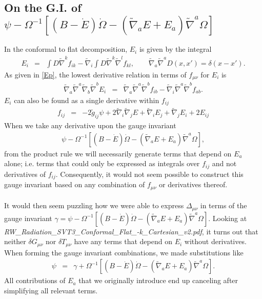 \documentclass[10pt,letterpaper]{article}
\numberwithin{equation}{section}
\begin{document}
\subsection{On the G.I. of $\psi- \Omega^{-1}[(B-\dot E)\dot\Omega- (\tilde\nabla_a E + E_a)\tilde\nabla^a\Omega]$ }
In the conformal to flat decomposition, $E_i$ is given by the integral
\begin{eqnarray}
E_i &=& \int D \tilde\nabla^k f_{ik} - \tilde\nabla_i \int D \tilde\nabla^k \tilde\nabla^l f_{kl},\qquad \tilde\nabla_a\tilde\nabla^a D(x,x') = \delta(x-x').
\end{eqnarray}
As given in \eqref{Ep}, the lowest derivative relation in terms of $f_{\mu\nu}$ for $E_i$ is
\begin{eqnarray}
\tilde\nabla_a\tilde\nabla^a \tilde\nabla_b\tilde\nabla^b E_i &=&
\tilde\nabla_a\tilde\nabla^a \tilde\nabla^b f_{ib} - \tilde\nabla_i \tilde\nabla^a\tilde\nabla^b f_{ab}.
\end{eqnarray}
$E_i$ can also be found as a single derivative within $f_{ij}$
\begin{eqnarray}
f_{ij}&=& -2\tilde g_{ij}\psi + 2\tilde\nabla_i\tilde\nabla_j E + \tilde\nabla_i E_j + \tilde\nabla_j E_i + 2E_{ij}
\end{eqnarray}
When we take any derivative upon the gauge invariant
\begin{eqnarray}
\psi- \Omega^{-1}[(B-\dot E)\dot\Omega- (\tilde\nabla_a E + E_a)\tilde\nabla^a\Omega],
\end{eqnarray}
from the product rule we will necessarily generate terms that depend on $E_a$ alone; i.e. terms that could only be expressed as integrals over $f_{ij}$ and not derivatives of $f_{ij}$. Consequently, it would not seem possible to construct this gauge invariant based on any combination of $f_{\mu\nu}$ or derivatives thereof. 
\\ \\
It would then seem puzzling how we were able to express $\Delta_{\mu\nu}$ in terms of the gauge invariant $\gamma=\psi- \Omega^{-1}[(B-\dot E)\dot\Omega- (\tilde\nabla_a E + E_a)\tilde\nabla^a\Omega]$. Looking at \emph{RW\_Radiation\_SVT3\_Conformal\_Flat\_-k\_Cartesian\_v2.pdf}, it turns out that neither $\delta G_{\mu\nu}$ nor $\delta T_{\mu\nu}$ have any terms that depend on $E_i$ without derivatives. When forming the gauge invariant combinations, we made substitutions like
\begin{eqnarray}
\psi &=& \gamma + \Omega^{-1}[(B-\dot E)\dot\Omega- (\tilde\nabla_a E + E_a)\tilde\nabla^a\Omega].
\end{eqnarray}
All contributions of $E_a$ that we originally introduce end up canceling after simplifying all relevant terms.
\end{document}

